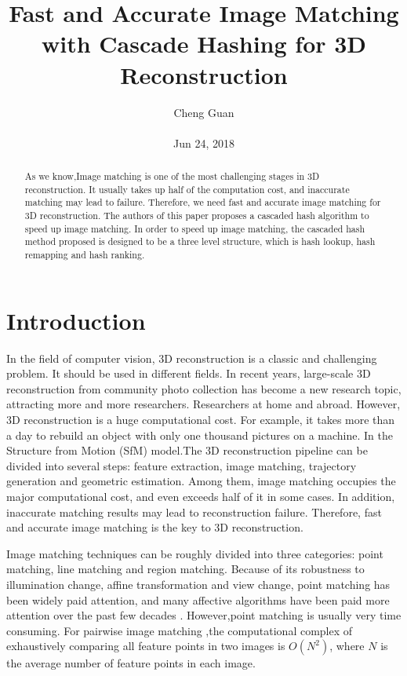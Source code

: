 \documentclass[10pt,twocolumn,letterpaper]{article}
\title{Fast and Accurate Image Matching with Cascade Hashing for 3D Reconstruction}
\author{Cheng Guan\\\\
Jun 24, 2018}
\begin{document}
\maketitle
\begin{abstract}
As we know,Image matching is one of the most challenging stages in 3D reconstruction. It usually takes up half of the computation cost, and inaccurate matching may lead to failure. Therefore, we need fast and accurate image matching for 3D reconstruction. The authors of this paper proposes a cascaded hash algorithm to speed up image matching. In order to speed up image matching, the cascaded hash method proposed is designed to be a three level structure, which is hash lookup, hash remapping and hash ranking.
\end{abstract}

\section{Introduction}
In the field of computer vision, 3D reconstruction is a classic and challenging problem. It should be used in different fields. In recent years, large-scale 3D reconstruction from community photo collection has become a new research topic, attracting more and more researchers. Researchers at home and abroad. However, 3D reconstruction is a huge computational cost. For example, it takes more than a day to rebuild an object with only one thousand pictures on a machine.
In the Structure from Motion (SfM) model\cite{agarwal2011building,crandall2011discrete}.The 3D reconstruction pipeline can be divided into several steps: feature extraction, image matching, trajectory generation and geometric estimation. Among them, image matching occupies the major computational cost, and even exceeds half of it in some cases. In addition, inaccurate matching results may lead to reconstruction failure. Therefore, fast and accurate image matching is the key to 3D reconstruction.
\par
Image matching techniques can be roughly divided into three categories: point matching, line matching and region matching. Because of its robustness to illumination change, affine transformation and view change, point matching has been widely paid attention, and many affective algorithms have been paid more attention over the past few decades \cite{bay2008speeded,lowe2004distinctive}. However,point matching is usually very time consuming. For pairwise image matching ,the computational complex of exhaustively comparing all feature points in two images is $O\left(N^2\right)$, where $N$ is the average number of feature points in each image.
\end{document}
